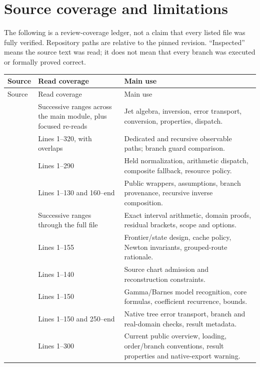 \section{Source coverage and limitations}\label{app:coverage}
The following is a review-coverage ledger, not a claim that every listed file was fully verified. Repository paths are relative to the pinned revision. ``Inspected'' means the source text was read; it does not mean that every branch was executed or formally proved correct.

\begin{longtable}{P{0.43\textwidth}P{0.2\textwidth}P{0.27\textwidth}}
\toprule Source & Read coverage & Main use \\\midrule
\endfirsthead
\toprule Source & Read coverage & Main use \\\midrule
\endhead
{} & Successive ranges across the main module, plus focused re-reads & Jet algebra, inversion, error transport, conversion, properties, dispatch. \\
 & Lines 1--320, with overlaps & Dedicated and recursive observable paths; branch guard comparison. \\
 & Lines 1--290 & Held normalization, arithmetic dispatch, composite fallback, resource policy. \\
 & Lines 1--130 and 160--end & Public wrappers, assumptions, branch provenance, recursive inverse composition. \\
 & Successive ranges through the full file & Exact interval arithmetic, domain proofs, residual brackets, scope and options. \\
 & Lines 1--155 & Frontier/state design, cache policy, Newton invariants, grouped-route rationale. \\
 & Lines 1--140 & Source chart admission and reconstruction constraints. \\
 & Lines 1--150 & Gamma/Barnes model recognition, core formulas, coefficient recurrence, bounds. \\
 & Lines 1--150 and 250--end & Native tree error transport, branch and real-domain checks, result metadata. \\
 & Lines 1--300 & Current public overview, loading, order/branch conventions, result properties and native-export warning. \\

\end{longtable}
